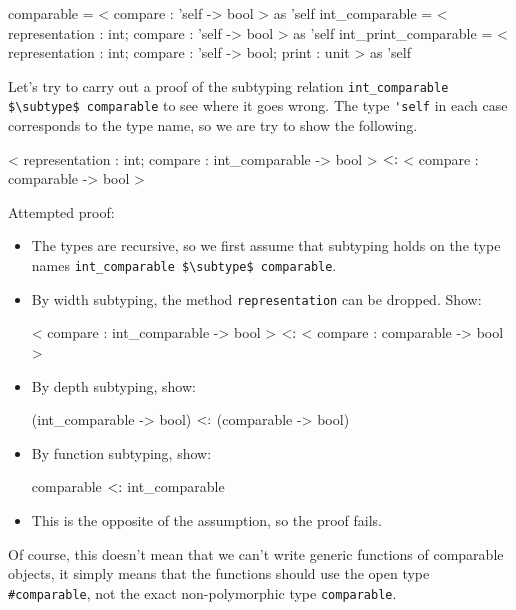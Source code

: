 \begin{ocaml}
comparable = < compare : 'self -> bool > as 'self
int_comparable =
   < representation : int;
     compare : 'self -> bool > as 'self
int_print_comparable =
   < representation : int;
     compare : 'self -> bool;
     print : unit > as 'self
\end{ocaml}
%
Let's try to carry out a proof of the subtyping relation
\hbox{\lstinline/int_comparable $\subtype$ comparable/}
to see where it goes wrong.  The type \hbox{\lstinline/'self/} in each case corresponds
to the type name, so we are try to show the following.

\begin{ocaml}
< representation : int; compare : int_comparable -> bool >
$\mathrel{\hbox{<:}}$ < compare : comparable -> bool >
\end{ocaml}
%
Attempted proof:
\begin{itemize}
\item 
The types are recursive, so we first assume that subtyping holds on the type
names \hbox{\lstinline/int_comparable $\subtype$ comparable/}.
\item
By width subtyping, the method \hbox{\lstinline/representation/} can be dropped.
Show:
\begin{ocaml}
< compare : int_comparable -> bool > $\mathrel{\hbox{<:}}$ < compare : comparable -> bool >
\end{ocaml}
\item
By depth subtyping, show:
\begin{ocaml}
(int_comparable -> bool) $\mathrel{\hbox{<:}}$ (comparable -> bool)
\end{ocaml}
\item
By function subtyping, show:
\begin{ocaml}
comparable $\mathrel{\hbox{<:}}$ int_comparable
\end{ocaml}
\item This is the opposite of the assumption, so the proof fails.
\end{itemize}


Of course, this doesn't mean that we can't write generic functions of comparable objects, it simply
means that the functions should use the open type \hbox{\lstinline/#comparable/}, not the exact
non-polymorphic type \hbox{\lstinline/comparable/}.

